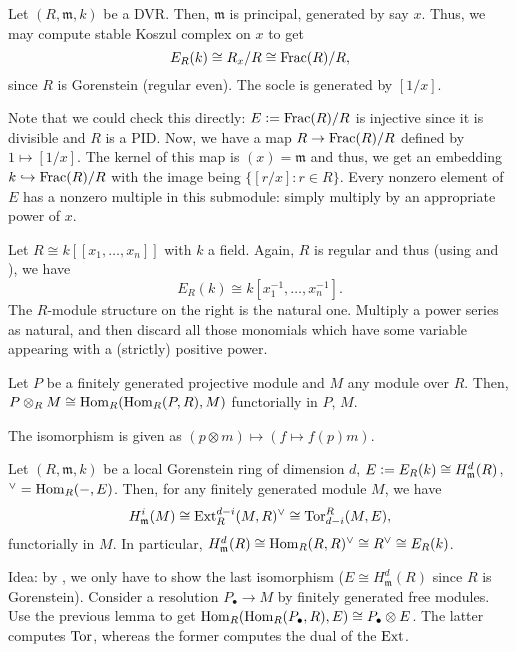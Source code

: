 \documentclass[12pt]{article}
\begin{document}
\begin{ex}
	Let $(R, \mathfrak{m}, k)$ be a DVR. Then, $\mathfrak{m}$ is principal, generated by say $x$. Thus, we may compute stable Koszul complex on $x$ to get
	\begin{equation*} 
		E_{R}(k) \cong R_{x}/R \cong \operatorname{Frac}(R)/R,
	\end{equation*}
	since $R$ is Gorenstein (regular even). The socle is generated by $[1/x]$.

	Note that we could check this directly: $E \vcentcolon= \operatorname{Frac}(R)/R$ is injective since it is divisible and $R$ is a PID. Now, we have a map $R \to \operatorname{Frac}(R)/R$ defined by $1 \mapsto [1/x]$. \newline
	The kernel of this map is $(x) = \mathfrak{m}$ and thus, we get an embedding $k \hookrightarrow \operatorname{Frac}(R)/R$ with the image being $\{[r/x] : r \in R\}$. Every nonzero element of $E$ has a nonzero multiple in this submodule: simply multiply by an appropriate power of $x$.
\end{ex}

\begin{ex}
	Let $R \cong k[\![x_{1}, \ldots, x_{n}]\!]$ with $k$ a field. Again, $R$ is regular and thus (using  and ), we have
	\begin{equation*} 
		E_{R}(k) \cong k[x_{1}^{-1}, \ldots, x_{n}^{-1}].
	\end{equation*}
	The $R$-module structure on the right is the natural one. Multiply a power series as natural, and then discard all those monomials which have some variable appearing with a (strictly) positive power.
\end{ex}

\begin{lem} 
	Let $P$ be a finitely generated projective module and $M$ any module over $R$. Then, $P \otimes_{R} M \cong \operatorname{Hom}_{R}(\operatorname{Hom}_{R}(P, R), M)$ functorially in $P$, $M$.
\end{lem}
The isomorphism is given as $(p \otimes m) \mapsto (f \mapsto f(p) m)$.

\begin{thm} \label{thm:local-duality-gorenstein}
	Let $(R, \mathfrak{m}, k)$ be a local Gorenstein ring of dimension $d$, $E \vcentcolon= E_{R}(k) \cong H_{\mathfrak{m}}^{d}(R)$, $^{\vee} = \operatorname{Hom}_{R}(-, E)$. \newline
	Then, for any finitely generated module $M$, we have
	\begin{equation*} 
		H_{\mathfrak{m}}^{i}(M) \cong \operatorname{Ext}_{R}^{d - i}(M, R)^{\vee} \cong \operatorname{Tor}^{R}_{d - i}(M, E),
	\end{equation*}
	functorially in $M$. In particular, $H_{\mathfrak{m}}^{d}(R) \cong \operatorname{Hom}_{R}(R, R)^{\vee} \cong R^{\vee} \cong E_{R}(k)$.
\end{thm}
Idea: by , we only have to show the last isomorphism ($E \cong H_{\mathfrak{m}}^{d}(R)$ since $R$ is Gorenstein). Consider a resolution $P_{\bullet} \to M$ by finitely generated free modules. Use the previous lemma to get $\operatorname{Hom}_{R}(\operatorname{Hom}_{R}(P_{\bullet}, R), E) \cong P_{\bullet} \otimes E$. The latter computes $\operatorname{Tor}$, whereas the former computes the dual of the $\operatorname{Ext}$.
\end{document}
